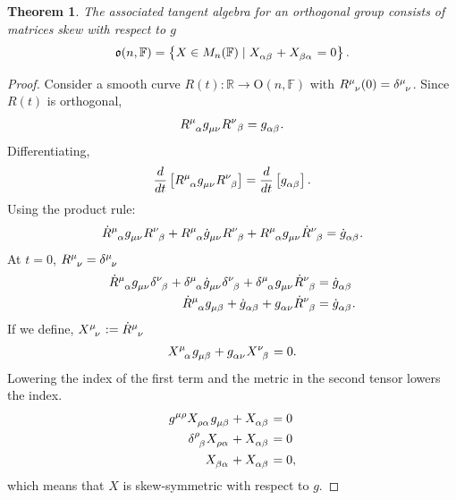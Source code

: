\documentclass{amsart}
\newtheorem{theorem}{Theorem}[section]
\theoremstyle{definition}
\theoremstyle{remark}
\begin{document}
\begin{theorem}
  The associated tangent algebra for an orthogonal group consists of matrices skew with respect to $g$
  \begin{equation*}
    \mathfrak{o}(n, \mathbb{F}) = \left\{X \in M_n(\mathbb{F}) \mid \tensor{X}{_\alpha_\beta} + \tensor{X}{_\beta_\alpha} = 0 \right\}.
  \end{equation*}
\end{theorem}
\begin{proof}
  Consider a smooth curve $R(t): \mathbb{R} \to \mathrm{O}(n, \mathbb{F})$ with $\tensor{R}{^\mu_\nu}(0)=\tensor{\delta}{^\mu_\nu}$.
  Since $R(t)$ is orthogonal,
  \begin{align*}
    \tensor{R}{^\mu_\alpha} \tensor{g}{_\mu_\nu} \tensor{R}{^\nu}{_\beta} = \tensor{g}{_\alpha_\beta}.
  \end{align*}
  Differentiating,
  \begin{align*}
    \frac{d}{dt}\left[ \tensor{R}{^\mu_\alpha} \tensor{g}{_\mu_\nu} \tensor{R}{^\nu_\beta} \right] = \frac{d}{dt} \left[ \tensor{g}{_\alpha_\beta} \right].
  \end{align*}
  Using the product rule:
  \begin{align*}
    \tensor{\dot{R}}{^\mu_\alpha} \tensor{g}{_\mu_\nu} \tensor{R}{^\nu_\beta} + \tensor{R}{^\mu_\alpha} \tensor{\dot{g}}{_\mu_\nu} \tensor{R}{^\nu_\beta} + \tensor{R}{^\mu_\alpha} \tensor{g}{_\mu_\nu} \tensor{\dot{R}}{^\nu_\beta} = \tensor{\dot{g}}{_\alpha_\beta}.
  \end{align*}
  At $t=0$, $\tensor{R}{^\mu_\nu}=\tensor{\delta}{^\mu_\nu}$
  \begin{align*}
    \tensor{\dot{R}}{^\mu_\alpha} \tensor{g}{_\mu_\nu} \tensor{\delta}{^\nu_\beta} + \tensor{\delta}{^\mu_\alpha} \tensor{\dot{g}}{_\mu_\nu} \tensor{\delta}{^\nu_\beta} + \tensor{\delta}{^\mu_\alpha} \tensor{g}{_\mu_\nu} \tensor{\dot{R}}{^\nu_\beta} &= \tensor{\dot{g}}{_\alpha_\beta} \\
    \tensor{\dot{R}}{^\mu_\alpha} \tensor{g}{_\mu_\beta} + \tensor{\dot{g}}{_\alpha_\beta} + \tensor{g}{_\alpha_\nu} \tensor{\dot{R}}{^\nu_\beta} &= \tensor{\dot{g}}{_\alpha_\beta}.
  \end{align*}
  If we define, $\tensor{X}{^\mu_\nu}:=\tensor{\dot{R}}{^\mu_\nu}$
  \begin{align*}
    \tensor{X}{^\mu_\alpha} \tensor{g}{_\mu_\beta} + \tensor{g}{_\alpha_\nu} \tensor{X}{^\nu_\beta} = 0.
  \end{align*}
  Lowering the index of the first term and the metric in the second tensor lowers the index.
  \begin{align*}
    \tensor{g}{^\mu^\rho} \tensor{X}{_\rho_\alpha} \tensor{g}{_\mu_\beta} + \tensor{X}{_\alpha_\beta} &= 0\\
    \tensor{\delta}{^\rho_\beta} \tensor{X}{_\rho_\alpha} + \tensor{X}{_\alpha_\beta} &= 0 \\
    \tensor{X}{_\beta_\alpha} + \tensor{X}{_\alpha_\beta} &= 0,
  \end{align*}
  which means that $X$ is skew-symmetric with respect to $g$.
\end{proof}
\end{document}
